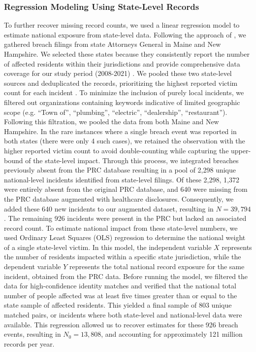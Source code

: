 \subsubsection{Regression Modeling Using State-Level Records}
To further recover missing record counts, we used a linear regression model to estimate national exposure from state-level data. Following the approach of \cite{Graves2018Should}, we gathered breach filings from state Attorneys General in Maine and New Hampshire. We selected these states because they consistently report the number of affected residents within their jurisdictions and provide comprehensive data coverage for our study period (2008-2021) \cite{NH_DOJ_Breach, Maine_AG_Breach}. We pooled these two state-level sources and deduplicated the records, prioritizing the highest reported victim count for each incident \cite{NH_DOJ_Breach, Maine_AG_Breach}. To minimize the inclusion of purely local incidents, we filtered out organizations containing keywords indicative of limited geographic scope (e.g. ``Town of'', ``plumbing'', ``electric'', ``dealership'', ``restaurant''). Following this filtration, we pooled the data from both Maine and New Hampshire. In the rare instances where a single breach event was reported in both states (there were only 4 such cases), we retained the observation with the higher reported victim count to avoid double-counting while capturing the upper-bound of the state-level impact. Through this process, we integrated breaches previously absent from the PRC database resulting in a pool of 2,298 unique national-level incidents identified from state-level filings. Of these 2,298, 1,372 were entirely absent from the original PRC database, and 640 were missing from the PRC database augmented with healthcare disclosures. Consequently, we added these 640 new incidents to our augmented dataset, resulting in $N = 39,794$. The remaining 926 incidents were present in the PRC but lacked an associated record count.
To estimate national impact from these state-level numbers, we used Ordinary Least Squares (OLS) regression to determine the national weight of a single state-level victim. In this model, the independent variable $X$ represents the number of residents impacted within a specific state jurisdiction, while the dependent variable $Y$ represents the total national record exposure for the same incident, obtained from the PRC data. Before running the model, we filtered the data for high-confidence identity matches and verified that the national total number of people affected was at least five times greater than or equal to the state sample of affected residents. This yielded a final sample of 803 unique matched pairs, or incidents where both state-level and national-level data were available. This regression allowed us to recover estimates for these 926 breach events, resulting in $N_0 = 13,808$, and accounting for approximately 121 million records per year.
